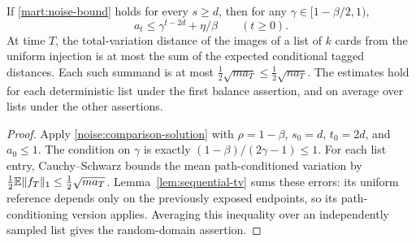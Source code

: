 \begin{lemma}\label{mart:decay}
If \eqref{mart:noise-bound} holds for every $s\ge d$, then for any
$\gamma\in[1-\beta/2,1)$,
\begin{equation}\label{mart:decay-bound}
 a_t\le\gamma^{t-2d}+\eta/\beta\qquad(t\ge0).
\end{equation}
At time $T$, the total-variation distance of the images of a list of
$k$ cards from the uniform injection is at most the sum of the
expected conditional tagged distances.  Each such summand is at most
$\frac12\sqrt{ma_T}\le\frac12\sqrt{na_T}$.
The estimates hold for each deterministic list under the first balance
assertion, and on average over lists under the other assertions.
\end{lemma}
\begin{proof}
Apply \eqref{noise:comparison-solution} with
$\rho=1-\beta$, $s_0=d$, $t_0=2d$, and $a_0\le1$.
The condition on $\gamma$ is exactly
$(1-\beta)/(2\gamma-1)\le1$.
For each list entry, Cauchy--Schwarz bounds the mean path-conditioned
variation by $\frac12\mathbb E\|f_T\|_1\le\frac12\sqrt{ma_T}$.
Lemma~\ref{lem:sequential-tv} sums these errors: its uniform reference
depends only on the previously exposed endpoints, so its path-conditioning
version applies. Averaging this inequality over an independently sampled
list gives the random-domain assertion.
\end{proof}

